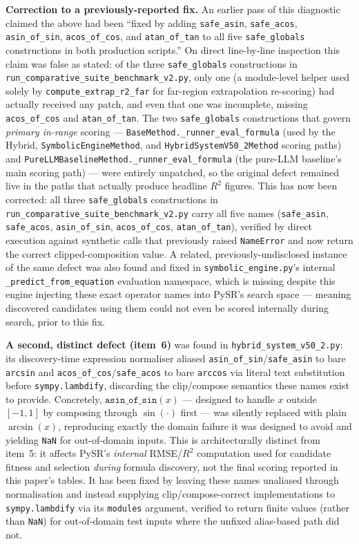 \documentclass[twoside,11pt]{article}
\newcommand{\Rsq}{R^{2}}
\begin{document}
\textbf{Correction to a previously-reported fix.} An earlier pass of this
diagnostic claimed the above had been ``fixed by adding \texttt{safe\_asin},
\texttt{safe\_acos}, \texttt{asin\_of\_sin}, \texttt{acos\_of\_cos}, and
\texttt{atan\_of\_tan} to all five \texttt{safe\_globals} constructions in
both production scripts.'' On direct line-by-line inspection this claim
was false as stated: of the three \texttt{safe\_globals} constructions in
\texttt{run\_comparative\_suite\_benchmark\_v2.py}, only one (a module-level
helper used solely by \texttt{compute\_extrap\_r2\_far} for far-region
extrapolation re-scoring) had actually received any patch, and even that
one was incomplete, missing \texttt{acos\_of\_cos} and
\texttt{atan\_of\_tan}. The two \texttt{safe\_globals} constructions that
govern \emph{primary in-range} scoring ---
\texttt{BaseMethod.\_runner\_eval\_formula} (used by the Hybrid,
\texttt{SymbolicEngineMethod}, and \texttt{HybridSystemV50\_2Method}
scoring paths) and \texttt{PureLLMBaselineMethod.\_runner\_eval\_formula}
(the pure-LLM baseline's main scoring path) --- were entirely unpatched, so
the original defect remained live in the paths that actually produce
headline $\Rsq$ figures. This has now been corrected: all three
\texttt{safe\_globals} constructions in
\texttt{run\_comparative\_suite\_benchmark\_v2.py} carry all five names
(\texttt{safe\_asin}, \texttt{safe\_acos}, \texttt{asin\_of\_sin},
\texttt{acos\_of\_cos}, \texttt{atan\_of\_tan}), verified by direct
execution against synthetic calls that previously raised \texttt{NameError}
and now return the correct clipped-composition value. A related,
previously-undisclosed instance of the same defect was also found and
fixed in \texttt{symbolic\_engine.py}'s internal
\texttt{\_predict\_from\_equation} evaluation namespace, which is missing
despite this engine injecting these exact operator names into PySR's
search space --- meaning discovered candidates using them could not even
be scored internally during search, prior to this fix.

\textbf{A second, distinct defect (item~6)} was found in
\texttt{hybrid\_system\_v50\_2.py}: its discovery-time expression
normaliser aliased \texttt{asin\_of\_sin}/\texttt{safe\_asin} to bare
\texttt{arcsin} and \texttt{acos\_of\_cos}/\texttt{safe\_acos} to bare
\texttt{arccos} via literal text substitution before
\texttt{sympy.lambdify}, discarding the clip/compose semantics these names
exist to provide. Concretely, $\texttt{asin\_of\_sin}(x)$ --- designed to
handle $x$ outside $[-1,1]$ by composing through $\sin(\cdot)$ first ---
was silently replaced with plain $\arcsin(x)$, reproducing exactly the
domain failure it was designed to avoid and yielding \texttt{NaN} for
out-of-domain inputs. This is architecturally distinct from item~5: it
affects PySR's \emph{internal} RMSE/$\Rsq$ computation used for candidate
fitness and selection \emph{during} formula discovery, not the final
scoring reported in this paper's tables. It has been fixed by leaving
these names unaliased through normalisation and instead supplying
clip/compose-correct implementations to \texttt{sympy.lambdify} via its
\texttt{modules} argument, verified to return finite values (rather than
\texttt{NaN}) for out-of-domain test inputs where the unfixed alias-based
path did not.
\end{document}
